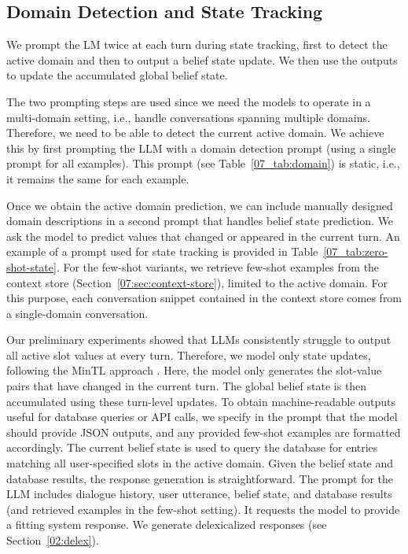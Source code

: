 \subsection{Domain Detection and State Tracking}
\label{07:sec:state-tracking}

We prompt the LM twice at each turn during state tracking, first to detect the active domain and then to output a belief state update. We then use the outputs to update the accumulated global belief state.

The two prompting steps are used since 
we need the models to operate in a multi-domain setting, i.e., handle conversations spanning multiple domains.
Therefore, we need to be able to detect the current active domain.
We achieve this by first prompting the LLM with a domain detection prompt (using a single prompt for all examples).
This prompt (see Table~\ref{07_tab:domain}) is static, i.e., it remains the same for each example.

Once we obtain the active domain prediction, we can include manually designed domain descriptions in a second prompt that handles belief state prediction.
We ask the model to predict values that changed or appeared in the current turn.
An example of a prompt used for state tracking is provided in Table~\ref{07_tab:zero-shot-state}.
For the few-shot variants, we retrieve few-shot examples from the context store (Section~\ref{07:sec:context-store}), limited to the active domain.
For this purpose, each conversation snippet contained in the context store comes from a single-domain conversation.

Our preliminary experiments showed that LLMs consistently struggle to output all active slot values at every turn.
Therefore, we model only state updates, following the MinTL approach \cite{lin-etal-2020-mintl}.
Here, the model only generates the slot-value pairs that have changed in the current turn.
The global belief state is then accumulated using these turn-level updates.
To obtain machine-readable outputs useful for database queries or API calls,
we specify in the prompt that the model should provide JSON outputs, and any provided few-shot examples are formatted accordingly. 
The current belief state is used to query the database for entries matching all user-specified slots in the active domain. Given the belief state and database results, the response generation is straightforward.
The prompt for the LLM includes dialogue history, user utterance, belief state, and database results (and retrieved examples in the few-shot setting).
It requests the model to provide a fitting system response.
We generate delexicalized responses (see Section~\ref{02:delex}).


